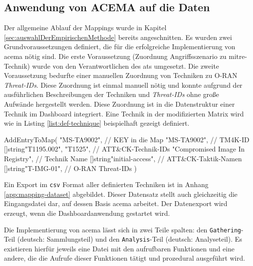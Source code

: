 \subsection{Anwendung von ACEMA auf die Daten}
\label{sec:impl-anwendungVonAcema}
Der allgemeine Ablauf der Mappings wurde in Kapitel \ref{sec:auswahlDerEmpirischenMethode} bereits angeschnitten. Es wurden zwei Grundvoraussetzungen definiert, die für die erfolgreiche Implementierung von \gls{acema} nötig sind. Die erste Voraussetzung (Zuordnung Angriffsszenario zu \gls{mitre}-Technik) wurde von den Verantwortlichen des \glspl{at} umgesetzt. Die zweite Voraussetzung bedurfte einer manuellen Zuordnung von Techniken zu O-RAN \textit{Threat-IDs}. Diese Zuordnung ist einmal manuell nötig und konnte aufgrund der ausführlichen Beschreibungen der Techniken und \textit{Threat-IDs} ohne große Aufwände hergestellt werden. Diese Zuordnung ist in die Datenstruktur einer Technik im Dashboard integriert. Eine Technik in der modifizierten Matrix wird wie in Listing \ref{list:def-technique} beispielhaft gezeigt definiert.
\begin{code}[caption=Beispielhafte Definition einer Technik im Dashboard, label={list:def-technique}]
    AddEntryToMap(
        "MS-TA9002",                        // KEY in die Map
        "MS-TA9002",                        // TM4K-ID
        []string{"T1195.002", "T1525"},     // ATT&CK-Technik-IDs
        "Compromised Image In Registry",    // Technik Name
        []string{"initial-access"},         // ATT&CK-Taktik-Namen
        []string{"T-IMG-01"},               // O-RAN Threat-IDs
    )
\end{code}

Ein Export im \verb|csv| Format aller definierten Techniken ist in Anhang \ref{app:mapping-dataset} abgebildet. Dieser Datensatz stellt auch gleichzeitig die Eingangsdatei dar, auf dessen Basis \gls{acema} arbeitet. Der Datenexport wird erzeugt, wenn die Dashboardanwendung gestartet wird.
\par Die Implementierung von \gls{acema} lässt sich in zwei Teile spalten: den \verb|Gathering|-Teil (deutsch: Sammlungsteil) und den \verb|Analysis|-Teil (deutsch: Analyseteil). Es existieren hierfür jeweils eine Datei mit den aufrufbaren Funktionen und eine andere, die die Aufrufe dieser Funktionen tätigt und prozedural ausgeführt wird.

